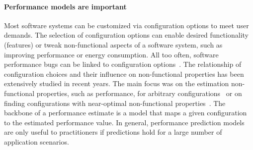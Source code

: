 \paragraph*{Performance models are important}
Most software systems can be customized via configuration options to meet user demands. The selection of configuration options can enable desired functionality (features) or tweak non-functional aspects of a software system, such as improving performance or energy consumption. 
All too often, software performance bugs can be linked to configuration options~\cite{han_empirical_2016}. 
The relationship of configuration choices and their influence on non-functional properties has been extensively studied in recent years. The main focus was on the estimation non-functional properties, such as performance, for arbitrary configurations~\cite{dorn2020,siegmundPerformanceinfluenceModelsHighly2015,haDeepPerf2019,perfAL,guoVariabilityawarePerformancePrediction2013,sarkarCostEfficientSamplingPerformance,guo_2018_data,fourier_learning_2015,perLasso} or on finding configurations with near-optimal non-functional properties~\cite{nairUsingBadLearners2017,nairFlash18,ohFindingNearoptimalConfigurations2017}. 
The backbone of a performance estimate is a model that maps a given configuration to the estimated performance value. 
In general, performance prediction models are only useful to practitioners if predictions hold for a large number of application scenarios.

